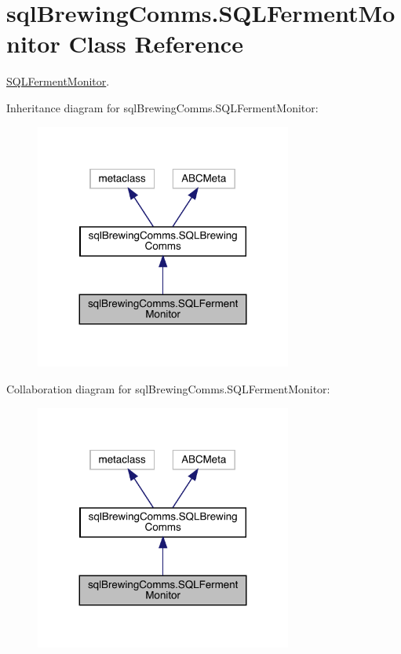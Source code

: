 \hypertarget{classsql_brewing_comms_1_1_s_q_l_ferment_monitor}{}\section{sql\+Brewing\+Comms.\+S\+Q\+L\+Ferment\+Monitor Class Reference}
\label{classsql_brewing_comms_1_1_s_q_l_ferment_monitor}


\mbox{\hyperlink{classsql_brewing_comms_1_1_s_q_l_ferment_monitor}{S\+Q\+L\+Ferment\+Monitor}}.  




Inheritance diagram for sql\+Brewing\+Comms.\+S\+Q\+L\+Ferment\+Monitor\+:\nopagebreak
\begin{figure}[H]
\begin{center}
\leavevmode
\includegraphics[width=239pt]{classsql_brewing_comms_1_1_s_q_l_ferment_monitor__inherit__graph}
\end{center}
\end{figure}


Collaboration diagram for sql\+Brewing\+Comms.\+S\+Q\+L\+Ferment\+Monitor\+:\nopagebreak
\begin{figure}[H]
\begin{center}
\leavevmode
\includegraphics[width=239pt]{classsql_brewing_comms_1_1_s_q_l_ferment_monitor__coll__graph}
\end{center}
\end{figure}
